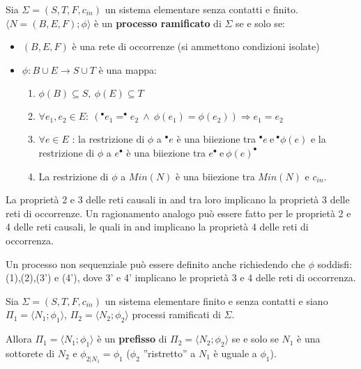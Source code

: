 \begin{definizione}
    Sia $\Sigma = (S,T, F, c_{in})$ un sistema elementare senza contatti e finito.
    $\langle N = (B, E, F); \phi \rangle$ è un \textbf{processo ramificato} di $\Sigma$
    se e solo se:
    \begin{itemize}
        \item $(B, E, F)$ è una rete di occorrenze (si ammettono condizioni isolate)
        \item $\phi: B \cup E \to S \cup T$ è una mappa:
              \begin{enumerate}
                  \item $\phi(B) \subseteq S, \ \phi(E) \subseteq T$
                  \item $\forall e_1, e_2 \in E: \ ( ^{\bullet} e_1 =  ^{\bullet}
                            e_2 \ \land \ \phi(e_1) = \phi(e_2)) \Rightarrow e_1 = e_2$
                  \item $\forall e \in E$ : la restrizione di $\phi$ a $^{\bullet} e$
                        è una biiezione tra $^{\bullet} e \ \text{e} \ ^{\bullet} \phi(e)$
                        e la restrizione di $\phi$ a $e^{\bullet}$ è una biiezione tra
                        $e^{\bullet} \ \text{e} \ \phi(e)^{\bullet}$
                  \item La restrizione di $\phi$ a $Min(N)$ è una biiezione tra
                        $Min(N)$ e $c_{in}$.
              \end{enumerate}
    \end{itemize}
\end{definizione}
La proprietà 2 e 3 delle reti causali in and tra loro implicano la proprietà 3
delle reti di occorrenze. Un ragionamento analogo può essere fatto per le proprietà
2 e 4 delle reti causali, le quali in and implicano la proprietà 4 delle reti
di occorrenza.
\begin{nota}
    Un processo non sequenziale può essere definito anche richiedendo che $\phi$
    soddisfi: (1),(2),(3') e (4'), dove 3' e 4' implicano le proprietà 3 e 4
    delle reti di occorrenza.
\end{nota}
\begin{definizione}
    Sia $\Sigma = (S,T, F, c_{in})$ un sistema elementare finito e senza contatti
    e siano $\Pi_1 = \langle N_1; \phi_1 \rangle$, $\Pi_2 = \langle N_2; \phi_2 \rangle$
    processi ramificati di $\Sigma$.

    Allora $\Pi_1 = \langle N_1; \phi_1 \rangle$ è un \textbf{prefisso} di
    $\Pi_2 = \langle N_2; \phi_2 \rangle$ se e solo se $N_1$ è una sottorete di
    $N_2$ e $\phi_{2|N_1} = \phi_1$ ($\phi_2$ ”ristretto” a $N_1$ è uguale a $\phi_1$).
\end{definizione}
